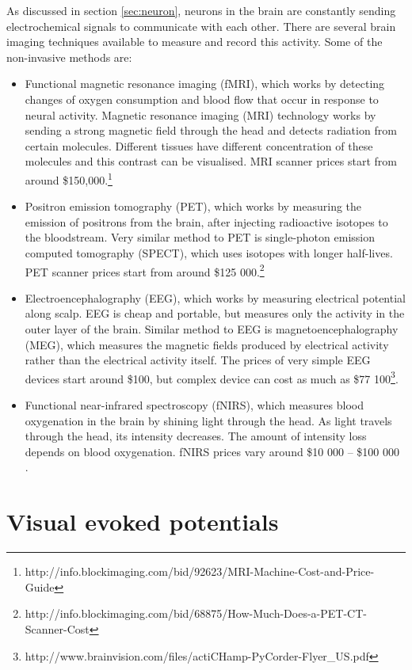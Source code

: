 As discussed in section \ref{sec:neuron}, neurons in the brain are constantly sending electrochemical signals to communicate with each other. There are several brain imaging techniques available to measure and record this activity. Some of the non-invasive methods are:
\begin{itemize}
	\item Functional magnetic resonance imaging (fMRI), which works by detecting changes of oxygen consumption and blood flow that occur in response to neural activity. Magnetic resonance imaging (MRI) technology works by sending a strong magnetic field through the head and detects radiation from certain molecules. Different tissues have different concentration of these molecules and this contrast can be visualised. MRI scanner prices start from around \$150,000.\footnote{http://info.blockimaging.com/bid/92623/MRI-Machine-Cost-and-Price-Guide}
	\item Positron emission tomography (PET), which works by measuring the emission of positrons from the brain, after injecting radioactive isotopes to the bloodstream. Very similar method to PET is single-photon emission computed tomography (SPECT), which uses isotopes with longer half-lives. PET scanner prices start from around \$125 000.\footnote{http://info.blockimaging.com/bid/68875/How-Much-Does-a-PET-CT-Scanner-Cost}
	\item Electroencephalography (EEG), which works by measuring electrical potential along scalp. EEG is cheap and portable, but measures only the activity in the outer layer of the brain. Similar method to EEG is magnetoencephalography (MEG), which measures the magnetic fields produced by electrical activity rather than the electrical activity itself. The prices of very simple EEG devices start around \$100, but complex device can cost as much as \$77 100\footnote{http://www.brainvision.com/files/actiCHamp-PyCorder-Flyer\_US.pdf}.
	\item Functional near-infrared spectroscopy (fNIRS), which measures blood oxygenation in the brain by shining light through the head. As light travels through the head, its intensity decreases. The amount of intensity loss depends on blood oxygenation. fNIRS prices vary around \$10 000 -- \$100 000 \cite{NIRS}.
\end{itemize}

\section{Visual evoked potentials}
 